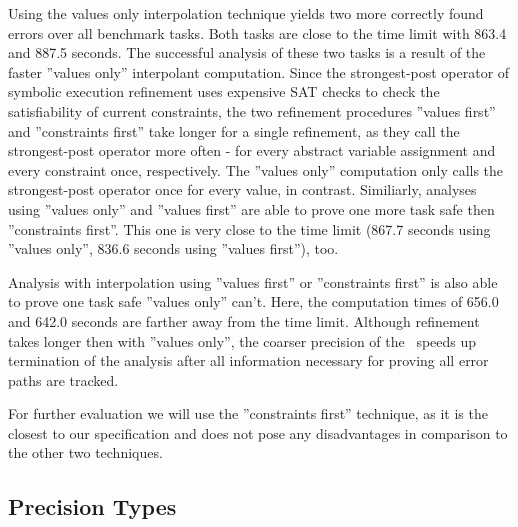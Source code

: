 Using the values only interpolation technique yields two more correctly found errors over all benchmark tasks.
Both tasks are close to the time limit with 863.4 and 887.5 seconds.
The successful analysis of these two tasks is a result of the faster ''values only'' interpolant computation.
Since the strongest-post operator of symbolic execution refinement uses expensive SAT checks to check the satisfiability of current constraints, the two refinement procedures
''values first'' and ''constraints first'' take longer for a single refinement, as they call the strongest-post operator more often - for every abstract variable assignment and every constraint once, respectively.
The ''values only'' computation only calls the strongest-post operator once for every value, in contrast.
Similiarly, analyses using ''values only'' and ''values first'' are able to prove one more task safe then ''constraints first''.
This one is very close to the time limit (867.7 seconds using ''values only'', 836.6 seconds using ''values first''), too.

Analysis with interpolation using ''values first'' or ''constraints first'' is also able to prove one task safe ''values only'' can't.
Here, the computation times of 656.0 and 642.0 seconds are farther away from the time limit.
Although refinement takes longer then with ''values only'', the coarser precision of the \constraintsCPA\ speeds up termination of the analysis after all information necessary for proving all error paths are tracked.

For further evaluation we will use the ''constraints first'' technique, as it is the closest to our specification and does not pose any disadvantages in comparison to the other two techniques.

\subsection{Precision Types}

